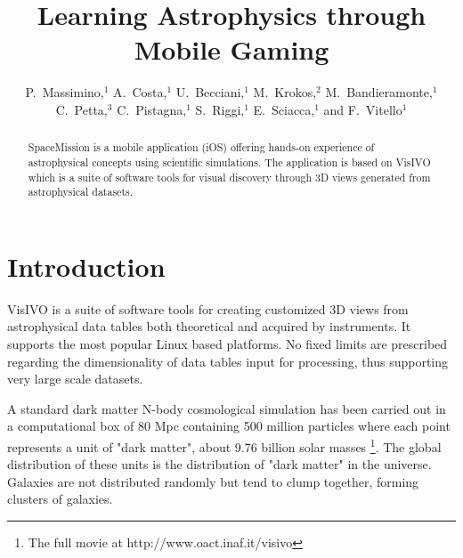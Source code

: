 
\resetcounters





\title{Learning Astrophysics through Mobile Gaming}
\author{P.~Massimino,$^1$ A.~Costa,$^1$ U.~Becciani,$^1$ M.~Krokos,$^2$ M.~Bandieramonte,$^1$ C.~Petta,$^3$ C.~Pistagna,$^1$ S.~Riggi,$^1$ E.~Sciacca,$^1$ and F.~Vitello$^1$
}


\begin{abstract}
SpaceMission is a mobile application (iOS) offering hands-on experience of astrophysical concepts using scientific simulations. The application is based on VisIVO which is a suite of software tools for visual discovery through 3D views generated from astrophysical datasets.
\end{abstract}

\section{Introduction}
VisIVO  is a suite of software tools for creating customized 3D views from astrophysical data tables both theoretical and acquired by instruments.
It supports the most popular Linux based platforms. No fixed limits are prescribed regarding the dimensionality of data tables input for processing, thus supporting very large scale datasets.\par
A standard dark matter N-body cosmological simulation has been carried out in a computational box of 80 Mpc containing 500 million particles where each point represents a unit  of "dark matter", about 9.76 billion solar masses \footnote{The full movie at http://www.oact.inaf.it/visivo}. The global distribution of these units is the distribution of "dark matter" in the universe. Galaxies are not distributed randomly but tend to clump together, forming clusters of galaxies.\par

